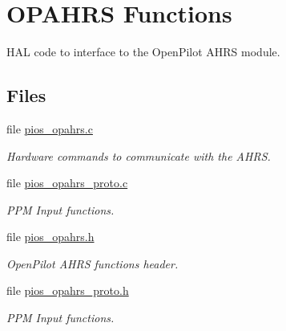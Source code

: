 \hypertarget{group___p_i_o_s___o_p_a_h_r_s}{\section{O\-P\-A\-H\-R\-S Functions}
\label{group___p_i_o_s___o_p_a_h_r_s}
}


H\-A\-L code to interface to the Open\-Pilot A\-H\-R\-S module.  


\subsection*{Files}
\begin{DoxyCompactItemize}
\item 
file \hyperlink{pios__opahrs_8c}{pios\-\_\-opahrs.\-c}
\begin{DoxyCompactList}\small\item\em Hardware commands to communicate with the A\-H\-R\-S. \end{DoxyCompactList}\item 
file \hyperlink{pios__opahrs__proto_8c}{pios\-\_\-opahrs\-\_\-proto.\-c}
\begin{DoxyCompactList}\small\item\em P\-P\-M Input functions. \end{DoxyCompactList}\item 
file \hyperlink{pios__opahrs_8h}{pios\-\_\-opahrs.\-h}
\begin{DoxyCompactList}\small\item\em Open\-Pilot A\-H\-R\-S functions header. \end{DoxyCompactList}\item 
file \hyperlink{pios__opahrs__proto_8h}{pios\-\_\-opahrs\-\_\-proto.\-h}
\begin{DoxyCompactList}\small\item\em P\-P\-M Input functions. \end{DoxyCompactList}\end{DoxyCompactItemize}
